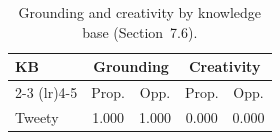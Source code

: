 \begin{table}[t]
\centering
\caption{Grounding and creativity by knowledge base (Section~7.6).}
\label{tab:debate-grounding-creativity}
\begin{tabular}{lcccc}
\toprule
KB & \multicolumn{2}{c}{Grounding} & \multicolumn{2}{c}{Creativity} \\
\cmidrule(lr){2-3} \cmidrule(lr){4-5}
 & Prop. & Opp. & Prop. & Opp. \\
\midrule
  Tweety & 1.000 & 1.000 & 0.000 & 0.000 \\
\bottomrule
\end{tabular}
\end{table}